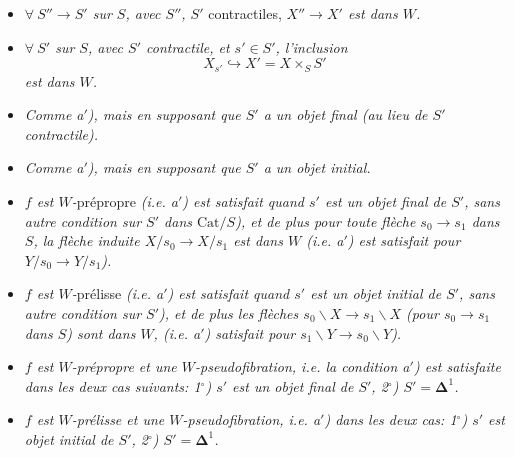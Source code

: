 \begin{itemize}[leftmargin=4em]
\item[\textit{a)}] \textit{$\forall\ S'' \longrightarrow S'$ sur $S$, avec $S''$, $S'$} contractiles, \textit{$X'' \longrightarrow X'$ est dans $W$.}

\item[\textit{a}$'$\textit{)}] \textit{$\forall\ S'$ sur $S$, avec $S'$ contractile, et $s' \in S'$, l'inclusion} %
\[ X_{s'} \hookrightarrow X' = X \times_S S' \]
\textit{est dans $W$.}

\item[\textit{a}$_1$\textit{)}] \textit{Comme a$'$), mais en supposant que $S'$ a un objet final (au lieu de $S'$ contractile).} %

\item[\textit{a}$_2$\textit{)}] \textit{Comme a$'$), mais en supposant que $S'$ a un objet initial.} %


\item[\textit{b}$_1$\textit{)}] \textit{$f$ est $W$-}prépropre \textit{(i.e. a$'$) est satisfait quand $s'$ est un objet final de $S'$, sans autre condition sur $S'$ dans $\mathrm{Cat}/S$), et de plus pour toute flèche $s_0 \longrightarrow s_1$ dans $S$, la flèche induite $X/s_0 \longrightarrow X/s_1$ est dans $W$ (i.e. a$'$) est satisfait pour $Y/s_0 \longrightarrow Y/s_1$).}

\item[\textit{b}$_2$\textit{)}] \textit{$f$ est $W$-}prélisse \textit{(i.e. a$'$) est satisfait quand $s'$ est un objet initial de $S'$, sans autre condition sur $S'$), et de plus les flèches $s_0\backslash X \longrightarrow s_1\backslash X$ (pour $s_0 \longrightarrow s_1$ dans $S$) sont dans $W$, (i.e. a$'$) satisfait pour $s_1\backslash Y \longrightarrow s_0\backslash Y$).}

\item[\textit{c}$_1$\textit{)}] \textit{$f$ est $W$-prépropre et une $W$-pseudofibration, i.e. la condition a$'$) est satisfaite dans les deux cas suivants: 1$^\circ$) $s'$ est un objet final de $S'$, 2$^\circ$) $S' = \mathbf{\Delta}^1$.}

\item[\textit{c}$_2$\textit{)}] \textit{$f$ est $W$-prélisse et une $W$-pseudofibration, i.e. a$'$) dans les deux cas: 1$^\circ$) $s'$ est objet initial de $S'$, 2$^\circ$) $S' = \mathbf{\Delta}^1$.}
\end{itemize}

